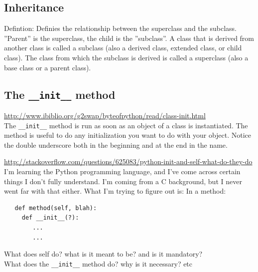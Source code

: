 \documentclass[11pt,a4paper]{article}
\begin{document}
    \subsection{Inheritance}
    Defintion: Definies the relationship between the superclass and the subclass. \\
    ''Parent'' is the superclass, the child is the ''subclass''. 
    A class that is derived from another class is called a subclass (also a derived class, extended class, or child class). The class from which the subclass is derived is called a superclass (also a base class or a parent class).
    
    \subsection{The {\tt \_\_init\_\_} method}
    \href{http://www.ibiblio.org/g2swap/byteofpython/read/class-init.html}{http://www.ibiblio.org/g2swap/byteofpython/read/class-init.html}\\
    The {\tt \_\_init\_\_} method is run as soon as an object of a
class is instantiated. The method is useful to do any initialization
you want to do with your object. Notice the double underscore both in
the beginning and at the end in the name.

    \href{http://stackoverflow.com/questions/625083/python-init-and-self-what-do-they-do}{http://stackoverflow.com/questions/625083/python-init-and-self-what-do-they-do}\\
   I'm learning the Python programming language, and I've come across
    certain things I don't fully understand. I'm coming from a C
    background, but I never went far with that either.
    What I'm trying to figure out is:
    In a method:
    \begin{lstlisting}
   def method(self, blah):
     def __init__(?):
        ...
        ...
  \end{lstlisting}
    What does self do? what is it meant to be? and is it mandatory?\\
    What does the {\tt \_\_init\_\_} method do? why is it necessary? etc\\
\end{document}
